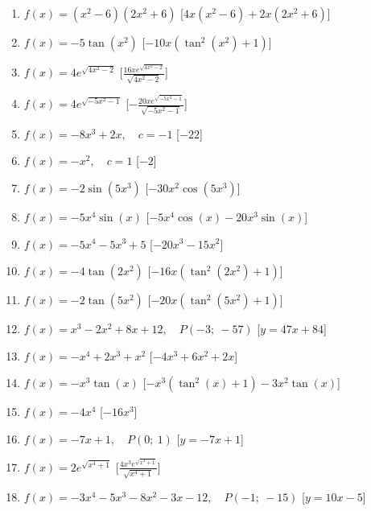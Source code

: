 \begin{enumerate}
\begin{enumerate}
\item \(f(x) = \left(x^{2} - 6\right) \left(2 x^{2} + 6\right)\) \hfill [\(4 x 
\left(x^{2} - 6\right) + 2 x \left(2 x^{2} + 6\right)\)]
\item \(f(x) = - 5 \tan{\left (x^{2} \right )}\) \hfill [\(- 10 x 
\left(\tan^{2}{\left (x^{2} \right )} + 1\right)\)]
\item \(f(x) = 4 e^{\sqrt{4 x^{2} - 2}}\) \hfill [\(\frac{16 x e^{\sqrt{4 x^{2} 
- 2}}}{\sqrt{4 x^{2} - 2}}\)]
\item \(f(x) = 4 e^{\sqrt{- 5 x^{2} - 1}}\) \hfill [\(- \frac{20 x e^{\sqrt{- 5 
x^{2} - 1}}}{\sqrt{- 5 x^{2} - 1}}\)]
\item \(f(x)= - 8 x^{3} + 2 x,\quad c=-1\) \hfill [\(-22\)]
\item \(f(x)= - x^{2},\quad c=1\) \hfill [\(-2\)]
\item \(f(x) = - 2 \sin{\left (5 x^{3} \right )}\) \hfill [\(- 30 x^{2} 
\cos{\left (5 x^{3} \right )}\)]
\item \(f(x) = - 5 x^{4} \sin{\left (x \right )}\) \hfill [\(- 5 x^{4} 
\cos{\left (x \right )} - 20 x^{3} \sin{\left (x \right )}\)]
\item \(f(x) = - 5 x^{4} - 5 x^{3} + 5\) \hfill [\(- 20 x^{3} - 15 x^{2}\)]
\item \(f(x) = - 4 \tan{\left (2 x^{2} \right )}\) \hfill [\(- 16 x 
\left(\tan^{2}{\left (2 x^{2} \right )} + 1\right)\)]
\item \(f(x) = - 2 \tan{\left (5 x^{2} \right )}\) \hfill [\(- 20 x 
\left(\tan^{2}{\left (5 x^{2} \right )} + 1\right)\)]
\item \(f(x)= x^{3} - 2 x^{2} + 8 x + 12,\quad P(-3;~-57)\) \hfill [\(y = 47 x + 
84\)]
\item \(f(x) = - x^{4} + 2 x^{3} + x^{2}\) \hfill [\(- 4 x^{3} + 6 x^{2} + 2 
x\)]
\item \(f(x) = - x^{3} \tan{\left (x \right )}\) \hfill [\(- x^{3} 
\left(\tan^{2}{\left (x \right )} + 1\right) - 3 x^{2} \tan{\left (x \right 
)}\)]
\item \(f(x) = - 4 x^{4}\) \hfill [\(- 16 x^{3}\)]
\item \(f(x)= - 7 x + 1,\quad P(0;~1)\) \hfill [\(y = - 7 x + 1\)]
\item \(f(x) = 2 e^{\sqrt{x^{4} + 1}}\) \hfill [\(\frac{4 x^{3} e^{\sqrt{x^{4} + 
1}}}{\sqrt{x^{4} + 1}}\)]
\item \(f(x)= - 3 x^{4} - 5 x^{3} - 8 x^{2} - 3 x - 12,\quad P(-1;~-15)\) \hfill 
[\(y = 10 x - 5\)]
\end{enumerate}


\end{enumerate}
